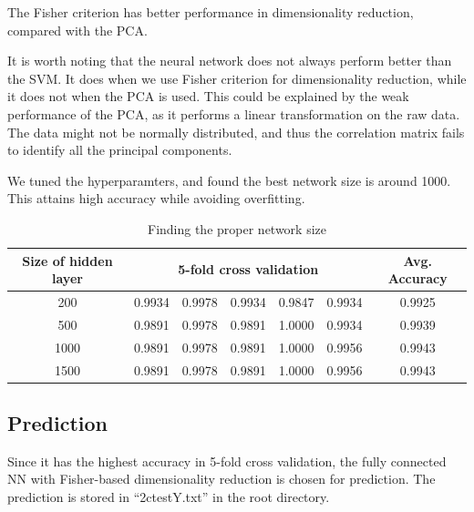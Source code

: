 \documentclass{article}
\begin{document}
{{        The Fisher criterion has better performance in dimensionality reduction, compared with the PCA. 

        It is worth noting that the neural network does not always perform better than the SVM. 
        It does when we use Fisher criterion for dimensionality reduction, while it does not when the PCA is used. 
        This could be explained by the weak performance of the PCA, as it performs a linear transformation on the raw data.
        The data might not be normally distributed, and thus the correlation matrix fails to identify all the principal components.

        We tuned the hyperparamters, and found the best network size is around 1000. This attains high accuracy while avoiding overfitting.

        \begin{table}[!hbp]
            \centering
            \begin{tabular}{|c|c|c|c|c|c|c|}
            \hline
            Size of hidden layer & \multicolumn{5}{|c|}{5-fold cross validation} & Avg. Accuracy \\
            \hline
            200 & 0.9934 & 0.9978 & 0.9934 & 0.9847 & 0.9934 & 0.9925 \\
            \hline
            500 & 0.9891 & 0.9978 & 0.9891 & 1.0000 & 0.9934 & 0.9939 \\
            \hline
            1000 & 0.9891 & 0.9978 & 0.9891 & 1.0000 & 0.9956 & 0.9943 \\
            \hline
            1500 & 0.9891 & 0.9978 & 0.9891 & 1.0000 & 0.9956 & 0.9943 \\
            \hline
            \end{tabular}
            \caption{Finding the proper network size}
        \end{table}
    }

    \subsection{Prediction}
    {
        Since it has the highest accuracy in 5-fold cross validation, the fully connected NN with Fisher-based dimensionality reduction is chosen for prediction. 
        The prediction is stored in ``2ctestY.txt'' in the root directory.
    }
}
\end{document}
